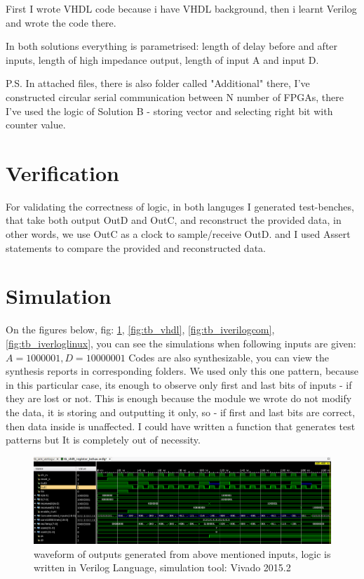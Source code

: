 \documentclass{article}
\begin{document}
First I wrote VHDL code because i have VHDL background, then i learnt Verilog and wrote the code there.

In both solutions everything is parametrised: length of delay before and after inputs, length of high impedance output, length of input A and input D.

P.S.
In attached files, there is also folder called "Additional" there, I've constructed circular serial communication between N number of FPGAs, there I've used the logic of Solution B - storing vector and selecting right bit with counter value.

\section{Verification}
For validating the correctness of logic, in both languges I generated test-benches, that take both output OutD and OutC, and reconstruct the provided data, in other words, we use OutC as a clock to sample/receive OutD. and I used Assert statements to compare the provided and reconstructed data.

\section{Simulation}
On the figures below, fig: \ref{fig:tb_verilog}, \ref{fig:tb_vhdl}, \ref{fig:tb_iverilogcom}, \ref{fig:tb_iverloglinux}, you can see the simulations when following inputs are given:
$A = 1000001, D = 10000001$
Codes are also synthesizable, you can view the synthesis reports in corresponding folders.
We used only this one pattern, because in this particular case, its enough to observe only first and last bits of inputs - if they are lost or not. This is enough because the module we wrote do not modify the data, it is storing and outputting it only, so - if first and last bits are correct, then data inside is unaffected. I could have written a function that generates test patterns but It is completely out of necessity.

\begin{figure}[H]
\centering
\includegraphics[width=\textwidth] {tb_verilog.png}
\caption{waveform of outputs generated from above mentioned inputs, logic is written in Verilog Language, simulation tool: Vivado 2015.2}
\label{fig:tb_verilog}
\end{figure}
\end{document}
